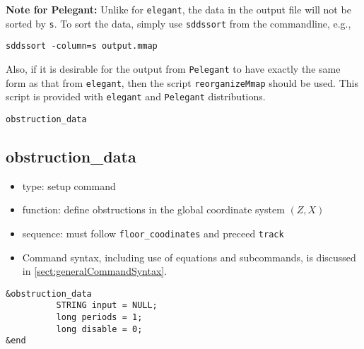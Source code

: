 \documentclass[11pt]{article}
\begin{document}
{\bf Note for Pelegant:} Unlike for {\tt elegant}, the data in the output file will not be sorted by \verb|s|.
To sort the data, simply use \verb|sddssort| from the commandline, e.g.,
\begin{verbatim}
sddssort -column=s output.mmap
\end{verbatim}
Also, if it is desirable for the output from \verb|Pelegant| to have exactly the same form as that from 
\verb|elegant|, then the script \verb|reorganizeMmap| should be used. This script is provided with 
\verb|elegant| and \verb|Pelegant| distributions.

\newpage
\begin{center}{\Large\verb|obstruction_data|}\end{center}
\subsection{obstruction\_data \label{subsec:obstructiondata}}

\begin{itemize}
\item type: setup command
\item function: define obstructions in the global coordinate system $(Z, X)$
\item sequence: must follow \verb|floor_coodinates| and preceed \verb|track|
\item Command syntax, including use of equations and subcommands, is discussed in \ref{sect:generalCommandSyntax}.
\end{itemize}

\begin{verbatim}
&obstruction_data
          STRING input = NULL;
          long periods = 1;
          long disable = 0;
&end
\end{verbatim}
\end{document}
